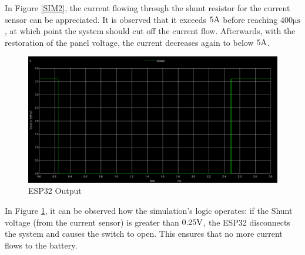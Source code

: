 In Figure \ref{SIM2}, the current flowing through the shunt resistor for the current sensor can be appreciated. It is observed that it exceeds $5\ampere$ before reaching $400 \si{\micro\second}$, at which point the system should cut off the current flow. Afterwards, with the restoration of the panel voltage, the current decreases again to below $5\ampere$.

\begin{figure}[H]
    \centering
    \includegraphics[width=\textwidth]{image/image3}
    \caption{ESP32 Output}\label{SIM3}
\end{figure}

In Figure \ref{SIM3}, it can be observed how the simulation's logic operates: if the Shunt voltage (from the current sensor) is greater than $0.25\volt$, the ESP32 disconnects the system and causes the switch to open. This ensures that no more current flows to the battery. 